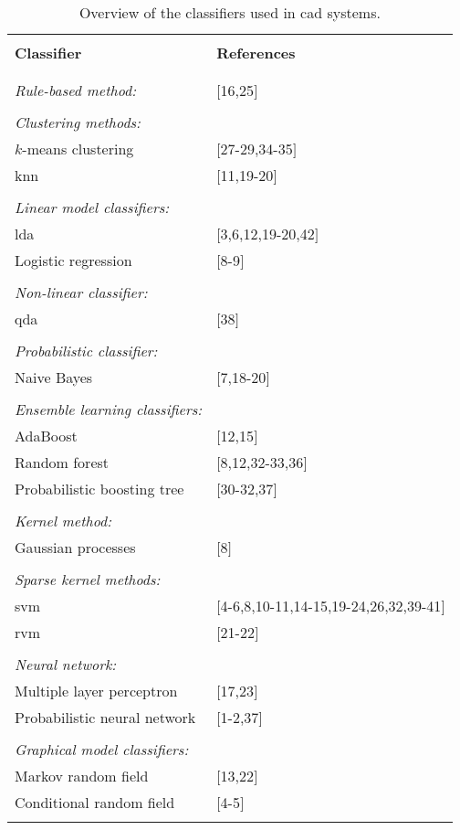 \begin{table}
	\caption{Overview of the classifiers used in \ac{cad} systems.}
	\small
	\renewcommand{\arraystretch}{.8}
	\begin{tabular}{p{.60\linewidth} p{.30\linewidth}}
		\hline \\ [-1.5ex]
		\textbf{Classifier} & \textbf{References} \\ \\ [-1.5ex]
		\hline \\ [-1.5ex]
		\textit{Rule-based method:} & $[$16,25$]$ \\ \\ [-1.5ex]
		\textit{Clustering methods:} & \\
		\quad $k$-means clustering & $[$27-29,34-35$]$ \\
		\quad \acs{knn} & $[$11,19-20$]$ \\ \\ [-1.5ex]
		\textit{Linear model classifiers:} & \\
		\quad \acs{lda} & $[$3,6,12,19-20,42$]$ \\
		\quad Logistic regression & $[$8-9$]$ \\ \\ [-1.5ex]
		\textit{Non-linear classifier:} & \\
		\quad \acs{qda} & $[$38$]$ \\ \\ [-1.5ex]
		\textit{Probabilistic classifier:} & \\
		\quad Naive Bayes & $[$7,18-20$]$ \\ \\ [-1.5ex]
		\textit{Ensemble learning classifiers:} & \\
		\quad AdaBoost & $[$12,15$]$ \\
		\quad Random forest & $[$8,12,32-33,36$]$ \\
		\quad Probabilistic boosting tree & $[$30-32,37$]$ \\ \\ [-1.5ex]
		\textit{Kernel method:} & \\
		\quad Gaussian processes & $[$8$]$ \\ \\ [-1.5ex]
		\textit{Sparse kernel methods:} & \\
		\quad \acs{svm} & $[$4-6,8,10-11,14-15,19-24,26,32,39-41$]$ \\
		\quad \acs{rvm} & $[$21-22$]$ \\ \\ [-1.5ex]
		\textit{Neural network:} & \\ 
		\quad Multiple layer perceptron & $[$17,23$]$ \\
		\quad Probabilistic neural network & $[$1-2,37$]$ \\ \\ [-1.5ex]
		\textit{Graphical model classifiers:} & \\
		\quad Markov random field & $[$13,22$]$ \\
		\quad Conditional random field & $[$4-5$]$ \\ \\ [-1.5ex]
		\hline
	\end{tabular}
	\label{tab:class}
\end{table}


